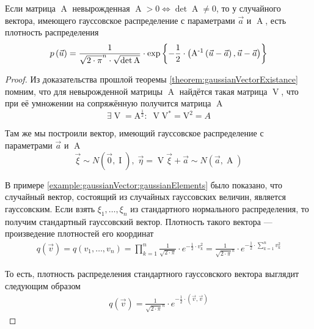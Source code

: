 \begin{theorem}
  \label{theorem:gaussianVector:dencity}
  Если матрица $\operatorname{A}$ невырожденная
  $\operatorname{A} > 0 \Leftrightarrow \det{\operatorname{A}} \neq 0$,
  то у случайного вектора, имеющего гауссовское распределение с параметрами
  $\vec{a}$ и $\operatorname{A}$, есть плотность распределения
  $$p\left(\vec{u}\right)
      = \frac{1}{\sqrt{2 \cdot \pi}^n \cdot \sqrt{\det{\operatorname{A}}}}
      \cdot \exp{\left\{ -\frac{1}{2} \cdot \left(
          \operatorname{A^{-1}} \left( \vec{u} - \vec{a} \right),
          \vec{u} - \vec{a} \right) \right\}}$$
\end{theorem}
\begin{proof}
  Из доказательства прошлой теоремы \ref{theorem:gaussianVectorExistance}
  помним, что для невырожденной матрицы $\operatorname{A}$ найдётся такая
  матрица $\operatorname{V}$, что при её умножении на сопряжённую получится
  матрица $\operatorname{A}$
  $$\exists \operatorname{V} = \operatorname{A^{\frac{1}{2}}}:\;
      \operatorname{V}\operatorname{V^*} = \operatorname{V^2} = A$$

  Там же мы построили вектор, имеющий гауссовское распределение с параметрами
  $\vec{a}$ и $\operatorname{A}$
  $$\vec{\xi} \sim N\left( \vec{0}, \operatorname{I} \right),\;
      \vec{\eta} = \operatorname{V} \vec{\xi} +\vec{a}
      \sim N\left( \vec{a}, \operatorname{A} \right)$$

  В примере \ref{example:gaussianVector:gaussianElements} было показано, что
  случайный вектор, состоящий из случайных гауссовских величин, является
  гауссовским. Если взять $\xi_1, \dots, \xi_n$ из стандартного нормального
  распределения, то получим стандартный гауссовский вектор. Плотность такого
  вектора --- произведение плотностей его координат
  \begin{align*}
      q\left( \vec{v} \right)
      = q\left( v_1, \dots, v_n \right)
      = \prod_{k=1}^n \frac{1}{\sqrt{2 \cdot \pi}}
      \cdot e^{-\frac{1}{2} \cdot v_k^2}
      = \frac{1}{\sqrt{2 \cdot \pi}^n}
      \cdot e^{-\frac{1}{2} \cdot \sum_{k=1}^n v_k^2}
  \end{align*}

  То есть, плотность распределения стандартного гауссовского вектора выглядит
  следующим образом
  \begin{align*}
      q\left( \vec{v} \right)
      = \frac{1}{\sqrt{2 \cdot \pi}^n}
      \cdot e^{-\frac{1}{2} \cdot \left( \vec{v}, \vec{v} \right)}
  \end{align*}


\end{proof}
